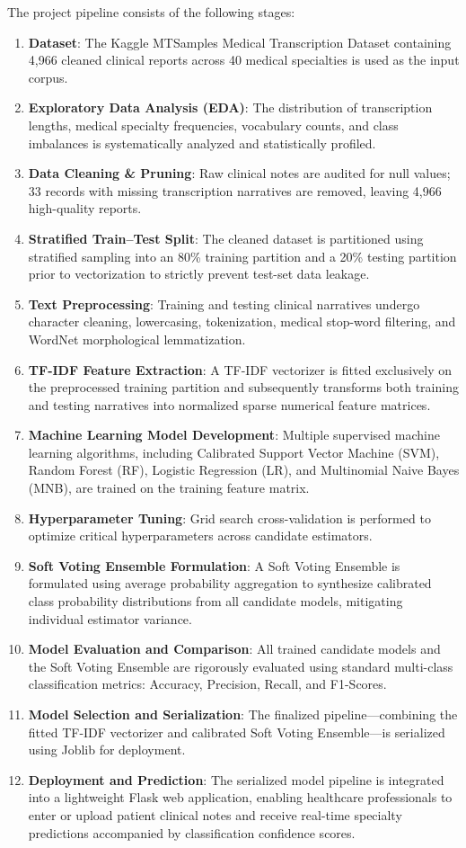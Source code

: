 The project pipeline consists of the following stages:
\begin{enumerate}
    \item \textbf{Dataset}: The Kaggle MTSamples Medical Transcription Dataset containing 4,966 cleaned clinical reports across 40 medical specialties is used as the input corpus.
    \item \textbf{Exploratory Data Analysis (EDA)}: The distribution of transcription lengths, medical specialty frequencies, vocabulary counts, and class imbalances is systematically analyzed and statistically profiled.
    \item \textbf{Data Cleaning \& Pruning}: Raw clinical notes are audited for null values; 33 records with missing transcription narratives are removed, leaving 4,966 high-quality reports.
    \item \textbf{Stratified Train--Test Split}: The cleaned dataset is partitioned using stratified sampling into an 80\% training partition and a 20\% testing partition prior to vectorization to strictly prevent test-set data leakage.
    \item \textbf{Text Preprocessing}: Training and testing clinical narratives undergo character cleaning, lowercasing, tokenization, medical stop-word filtering, and WordNet morphological lemmatization.
    \item \textbf{TF-IDF Feature Extraction}: A TF-IDF vectorizer is fitted exclusively on the preprocessed training partition and subsequently transforms both training and testing narratives into normalized sparse numerical feature matrices.
    \item \textbf{Machine Learning Model Development}: Multiple supervised machine learning algorithms, including Calibrated Support Vector Machine (SVM), Random Forest (RF), Logistic Regression (LR), and Multinomial Naive Bayes (MNB), are trained on the training feature matrix.
    \item \textbf{Hyperparameter Tuning}: Grid search cross-validation is performed to optimize critical hyperparameters across candidate estimators.
    \item \textbf{Soft Voting Ensemble Formulation}: A Soft Voting Ensemble is formulated using average probability aggregation to synthesize calibrated class probability distributions from all candidate models, mitigating individual estimator variance.
    \item \textbf{Model Evaluation and Comparison}: All trained candidate models and the Soft Voting Ensemble are rigorously evaluated using standard multi-class classification metrics: Accuracy, Precision, Recall, and F1-Scores.
    \item \textbf{Model Selection and Serialization}: The finalized pipeline—combining the fitted TF-IDF vectorizer and calibrated Soft Voting Ensemble—is serialized using Joblib for deployment.
    \item \textbf{Deployment and Prediction}: The serialized model pipeline is integrated into a lightweight Flask web application, enabling healthcare professionals to enter or upload patient clinical notes and receive real-time specialty predictions accompanied by classification confidence scores.
\end{enumerate}

